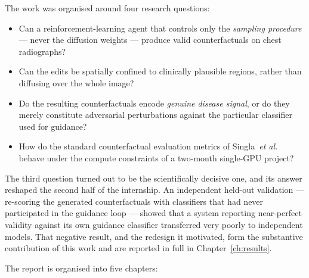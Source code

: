 The work was organised around four research questions:

\begin{itemize}[leftmargin=*]
  \item Can a reinforcement-learning agent that controls only the
        \emph{sampling procedure} --- never the diffusion weights ---
        produce valid counterfactuals on chest radiographs?
  \item Can the edits be spatially confined to clinically plausible
        regions, rather than diffusing over the whole image?
  \item Do the resulting counterfactuals encode \emph{genuine disease
        signal}, or do they merely constitute adversarial perturbations
        against the particular classifier used for guidance?
  \item How do the standard counterfactual evaluation metrics of
        Singla~\emph{et al.}~\cite{singla2022} behave under the compute
        constraints of a two-month single-GPU project?
\end{itemize}

The third question turned out to be the scientifically decisive one, and
its answer reshaped the second half of the internship. An independent
held-out validation --- re-scoring the generated counterfactuals with
classifiers that had never participated in the guidance loop --- showed
that a system reporting near-perfect validity against its own guidance
classifier transferred very poorly to independent models. That negative
result, and the redesign it motivated, form the substantive contribution
of this work and are reported in full in Chapter~\ref{ch:results}.

The report is organised into five chapters:

